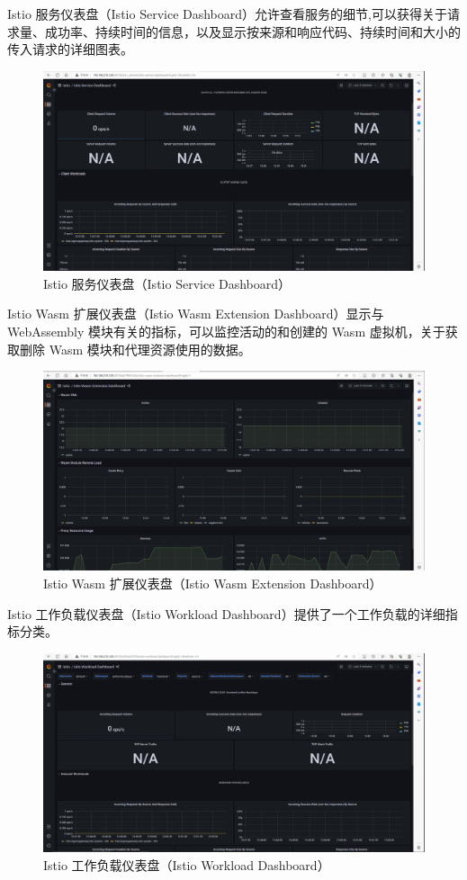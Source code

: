 Istio 服务仪表盘（Istio Service Dashboard）允许查看服务的细节,可以获得关于请求量、成功率、持续时间的信息，以及显示按来源和响应代码、持续时间和大小的传入请求的详细图表。
\begin{figure}[H]
	\centering
	\includegraphics[width=1.0\textwidth]{figures/chapter2/SD.png}
	\caption{Istio 服务仪表盘（Istio Service Dashboard）}
	\label{fig:3-Istio 服务仪表盘（Istio Service Dashboard）}
\end{figure}
Istio Wasm 扩展仪表盘（Istio Wasm Extension Dashboard）显示与 WebAssembly 模块有关的指标，可以监控活动的和创建的 Wasm 虚拟机，关于获取删除 Wasm 模块和代理资源使用的数据。
\begin{figure}[H]
	\centering
	\includegraphics[width=1.0\textwidth]{figures/chapter2/WED.png}
	\caption{Istio Wasm 扩展仪表盘（Istio Wasm Extension Dashboard）}
	\label{fig:3-Istio Wasm 扩展仪表盘（Istio Wasm Extension Dashboard）}
\end{figure}
Istio 工作负载仪表盘（Istio Workload Dashboard）提供了一个工作负载的详细指标分类。
\begin{figure}[H]
	\centering
	\includegraphics[width=1.0\textwidth]{figures/chapter2/WD.png}
	\caption{Istio 工作负载仪表盘（Istio Workload Dashboard）}
	\label{fig:3-Istio 工作负载仪表盘（Istio Workload Dashboard）}
\end{figure}
